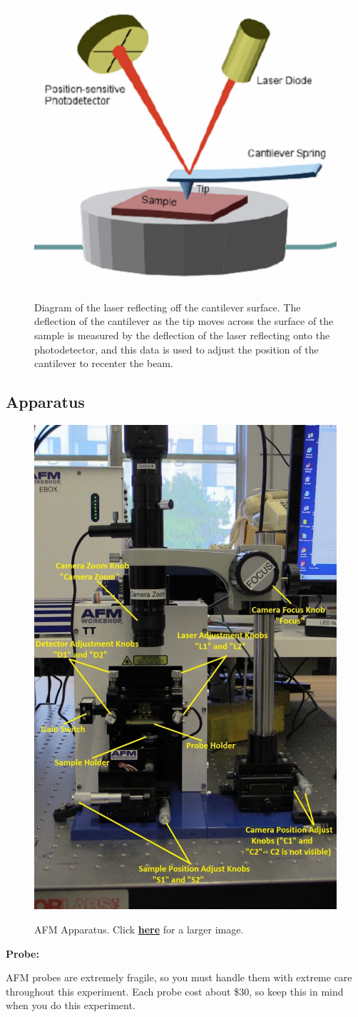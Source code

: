 \documentclass{../lab}
\begin{document}
\begin{figure}[h]
    \centering
    \href{http://experimentationlab.berkeley.edu/sites/default/files/AFMImages/2_0.png}{\includegraphics[width=0.5\linewidth]{images/2_0.png}}
    \caption{Diagram of the laser reflecting off the cantilever surface. The deflection of the cantilever as the tip moves across the surface of the sample is measured by the deflection of the laser reflecting onto the photodetector, and this data is used to adjust the position of the cantilever to recenter the beam.}
    \label{fig:BasicMechanism}
\end{figure}

\subsection{Apparatus}

\begin{figure}[h]
\centering
    \href{http://experimentationlab.berkeley.edu/sites/default/files/AFMImages/AFMgen.jpg}{\includegraphics[width=0.25\linewidth]{images/AFMgen.jpg}}
    \caption{AFM Apparatus. Click \href{http://experimentationlab.berkeley.edu/sites/default/files/AFMImages/AFMgen.jpg}{\textbf{here}} for a larger image.}
\end{figure}

\textbf{Probe:}

AFM probes are extremely fragile, so you must handle them with extreme care throughout this experiment. Each probe cost about \$30, so keep this in mind when you do this experiment.
\end{document}
